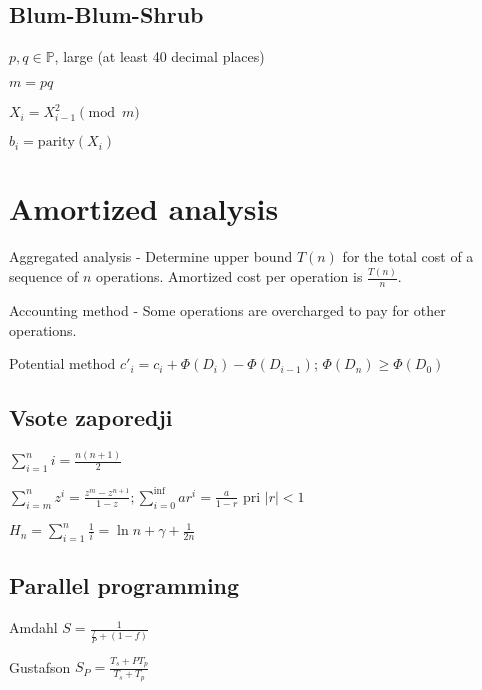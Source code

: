 \documentclass[a4paper]{article}
\begin{document}
\begin{multicols*}{2}
{	\subsection{Blum-Blum-Shrub}
	\begin{compactitem}
		\item $p, q\in \mathbb{P}$, large (at least 40 decimal places)
		\item $m = pq$
		\item $X_i=X_{i-1}^2 \pmod m$
		\item $b_i = \text{parity}(X_i)$
	\end{compactitem}


	\section{Amortized analysis}
	\begin{compactitem}
		\item Aggregated analysis -
		Determine upper bound $T(n)$ for the total cost of a sequence of $n$ operations.
		Amortized cost per operation is $\frac{T(n)}{n}$.
		\item Accounting method -
		Some operations are overcharged to pay for other operations.
		\item Potential method
		$c'_i = c_i + \Phi(D_i) - \Phi({D_{i - 1}})$;
		$\Phi(D_n) \geq \Phi(D_0)$
	\end{compactitem}

	\subsection{Vsote zaporedji}
	\begin{compactitem}
		\item $\sum_{i=1}^{n}i=\frac{n(n+1)}{2}$
		\item $\sum_{i=m}^{n}z^i=\frac{z^m-z^{n+1}}{1-z}; \sum_{i=0}^{\inf}ar^i = \frac{a}{1 - r}$ pri $|r| < 1$
		\item $H_n = \sum_{i=1}^{n}\frac{1}{i} = \ln n + \gamma + \frac{1}{2n}$
	\end{compactitem}

	\subsection{Parallel programming}

	\begin{compactitem}
		\item Amdahl $S = \frac{1}{\frac{f}{P}+(1-f)}$
		\item Gustafson $S_P = \frac{T_s + P T_p}{T_s + T_p}$
	\end{compactitem}

}
\end{multicols*}
\end{document}
